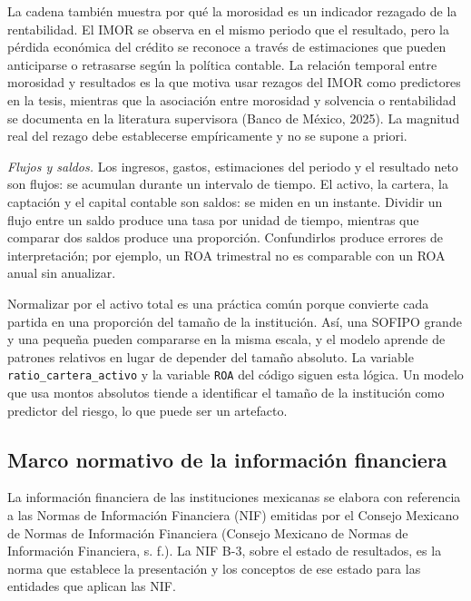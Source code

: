 La cadena también muestra por qué la morosidad es un indicador rezagado de la rentabilidad. El IMOR se observa en el mismo periodo que el resultado, pero la pérdida económica del crédito se reconoce a través de estimaciones que pueden anticiparse o retrasarse según la política contable. La relación temporal entre morosidad y resultados es la que motiva usar rezagos del IMOR como predictores en la tesis, mientras que la asociación entre morosidad y solvencia o rentabilidad se documenta en la literatura supervisora (Banco de México, 2025). La magnitud real del rezago debe establecerse empíricamente y no se supone a priori.

\textit{Flujos y saldos.} Los ingresos, gastos, estimaciones del periodo y el resultado neto son flujos: se acumulan durante un intervalo de tiempo. El activo, la cartera, la captación y el capital contable son saldos: se miden en un instante. Dividir un flujo entre un saldo produce una tasa por unidad de tiempo, mientras que comparar dos saldos produce una proporción. Confundirlos produce errores de interpretación; por ejemplo, un ROA trimestral no es comparable con un ROA anual sin anualizar.

Normalizar por el activo total es una práctica común porque convierte cada partida en una proporción del tamaño de la institución. Así, una SOFIPO grande y una pequeña pueden compararse en la misma escala, y el modelo aprende de patrones relativos en lugar de depender del tamaño absoluto. La variable \texttt{ratio\_cartera\_activo} y la variable \texttt{ROA} del código siguen esta lógica. Un modelo que usa montos absolutos tiende a identificar el tamaño de la institución como predictor del riesgo, lo que puede ser un artefacto.

\subsection{Marco normativo de la información financiera}
La información financiera de las instituciones mexicanas se elabora con referencia a las Normas de Información Financiera (NIF) emitidas por el Consejo Mexicano de Normas de Información Financiera (Consejo Mexicano de Normas de Información Financiera, s. f.). La NIF B-3, sobre el estado de resultados, es la norma que establece la presentación y los conceptos de ese estado para las entidades que aplican las NIF. %

